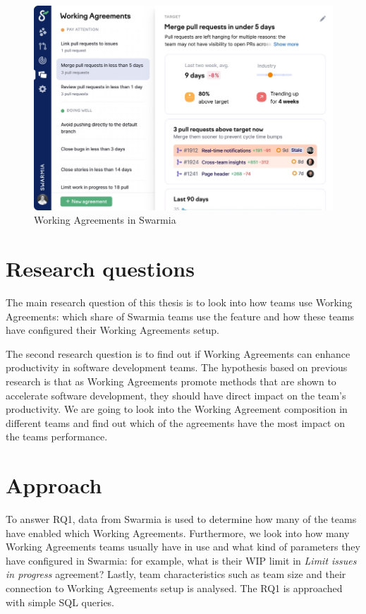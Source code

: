 \begin{figure}[ht]
    \begin{center}
        \includegraphics[width=13.5cm]{LaTeX/images/improvement.png}
        \caption{Working Agreements in Swarmia}
        \label{fig:WorkingAgreements}
    \end{center}
\end{figure}

\section{Research questions}

The main research question of this thesis is to look into how teams use Working Agreements: which share of Swarmia teams use the feature and how these teams have configured their Working Agreements setup. 

The second research question is to find out if Working Agreements can enhance productivity in software development teams. The hypothesis based on previous research is that as Working Agreements promote methods that are shown to accelerate software development, they should have direct impact on the team's productivity. We are going to look into the Working Agreement composition in different teams and find out which of the agreements have the most impact on the teams performance. 

\section{Approach}

To answer RQ1, data from Swarmia is used to determine how many of the teams have enabled which Working Agreements. Furthermore, we look into how many Working Agreements teams usually have in use and what kind of parameters they have configured in Swarmia: for example, what is their WIP limit in \textit{Limit issues in progress} agreement? Lastly, team characteristics such as team size and their connection to Working Agreements setup is analysed. The RQ1 is approached with simple SQL queries. 

